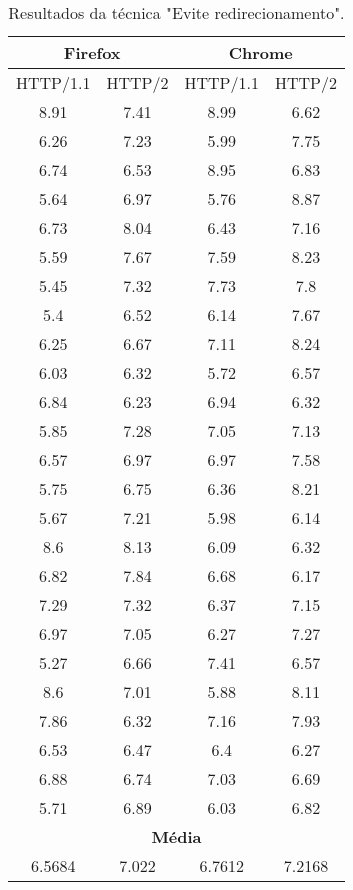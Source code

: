 \begin{table}[h]
	\centering
	\caption{Resultados da técnica "Evite redirecionamento".}
	\label{resultados-redirecionamento}
	\begin{tabular}{cccc}
		\hline
		\multicolumn{2}{c}{\textbf{Firefox}} & \multicolumn{2}{c}{\textbf{Chrome}} \\
		\hline
		HTTP/1.1 & HTTP/2 & HTTP/1.1 & HTTP/2 \\
		\hline
		8.91 & 7.41 & 8.99 & 6.62 \\
		6.26 & 7.23 & 5.99 & 7.75 \\
		6.74 & 6.53 & 8.95 & 6.83 \\
		5.64 & 6.97 & 5.76 & 8.87 \\
		6.73 & 8.04 & 6.43 & 7.16 \\
		5.59 & 7.67 & 7.59 & 8.23 \\
		5.45 & 7.32 & 7.73 & 7.8 \\
		5.4 & 6.52 & 6.14 & 7.67 \\
		6.25 & 6.67 & 7.11 & 8.24 \\
		6.03 & 6.32 & 5.72 & 6.57 \\
		6.84 & 6.23 & 6.94 & 6.32 \\
		5.85 & 7.28 & 7.05 & 7.13 \\
		6.57 & 6.97 & 6.97 & 7.58 \\
		5.75 & 6.75 & 6.36 & 8.21 \\
		5.67 & 7.21 & 5.98 & 6.14 \\ 
		8.6 & 8.13 & 6.09 & 6.32 \\
		6.82 & 7.84 & 6.68 & 6.17 \\
		7.29 & 7.32 & 6.37 & 7.15 \\
		6.97 & 7.05 & 6.27 & 7.27 \\
		5.27 & 6.66 & 7.41 & 6.57 \\
		8.6 & 7.01 & 5.88 & 8.11 \\
		7.86 & 6.32 & 7.16 & 7.93 \\
		6.53 & 6.47 & 6.4 & 6.27 \\
		6.88 & 6.74 & 7.03 & 6.69 \\
		5.71 & 6.89 & 6.03 & 6.82 \\
		\hline
		\multicolumn{4}{c}{\textbf{Média}} \\
		6.5684 & 7.022 & 6.7612 & 7.2168 \\
		\hline
	\end{tabular}
\end{table}
